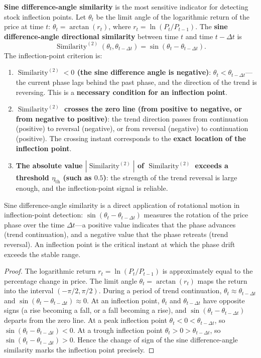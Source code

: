 \begin{proposition}\label{prop:sine_diff_inflection}
\textbf{Sine difference-angle similarity} is the most sensitive indicator for detecting stock inflection points. Let $\theta_t$ be the limit angle of the logarithmic return of the price at time $t$: $\theta_t = \arctan(r_t)$, where $r_t = \ln(P_t/P_{t-1})$. The \textbf{sine difference-angle directional similarity} between time $t$ and time $t-\Delta t$ is
\[
\operatorname{Similarity}^{(2)}(\theta_t, \theta_{t-\Delta t}) = \sin(\theta_t - \theta_{t-\Delta t}).
\]
The inflection-point criterion is:
\begin{enumerate}[label=(\roman*)]
    \item \textbf{$\operatorname{Similarity}^{(2)} < 0$ (the sine difference angle is negative)}: $\theta_t < \theta_{t-\Delta t}$---the current phase lags behind the past phase, and the direction of the trend is reversing. This is a \textbf{necessary condition for an inflection point}.
    \item \textbf{$\operatorname{Similarity}^{(2)}$ crosses the zero line (from positive to negative, or from negative to positive)}: the trend direction passes from continuation (positive) to reversal (negative), or from reversal (negative) to continuation (positive). The crossing instant corresponds to the \textbf{exact location of the inflection point}.
    \item \textbf{The absolute value $|\operatorname{Similarity}^{(2)}|$ of $\operatorname{Similarity}^{(2)}$ exceeds a threshold $\eta_{\text{th}}$ (such as $0.5$)}: the strength of the trend reversal is large enough, and the inflection-point signal is reliable.
\end{enumerate}
Sine difference-angle similarity is a direct application of rotational motion in inflection-point detection: $\sin(\theta_t - \theta_{t-\Delta t})$ measures the rotation of the price phase over the time $\Delta t$---a positive value indicates that the phase advances (trend continuation), and a negative value that the phase retreats (trend reversal). An inflection point is the critical instant at which the phase drift exceeds the stable range.
\end{proposition}

\begin{proof}
The logarithmic return $r_t = \ln(P_t/P_{t-1})$ is approximately equal to the percentage change in price. The limit angle $\theta_t = \arctan(r_t)$ maps the return into the interval $(-\pi/2, \pi/2)$. During a period of trend continuation, $\theta_t \approx \theta_{t-\Delta t}$ and $\sin(\theta_t - \theta_{t-\Delta t}) \approx 0$. At an inflection point, $\theta_t$ and $\theta_{t-\Delta t}$ have opposite signs (a rise becoming a fall, or a fall becoming a rise), and $\sin(\theta_t - \theta_{t-\Delta t})$ departs from the zero line. At a peak inflection point $\theta_t < 0 < \theta_{t-\Delta t}$, so $\sin(\theta_t - \theta_{t-\Delta t}) < 0$. At a trough inflection point $\theta_t > 0 > \theta_{t-\Delta t}$, so $\sin(\theta_t - \theta_{t-\Delta t}) > 0$. Hence the change of sign of the sine difference-angle similarity marks the inflection point precisely.
\end{proof}

